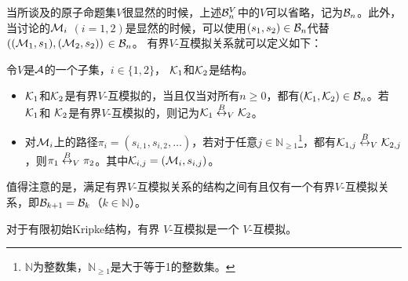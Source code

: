 当所谈及的原子命题集$V$很显然的时候，上述${\cal B}_n^V$中的$V$可以省略，记为${\cal B}_n$。此外，当讨论的${\cal M}_i$ $(i=1,2)$是显然的时候，可以使用$(s_1,s_2) \in {\cal B}_n$代替$(({\cal M}_1,s_1),({\cal M}_2,s_2))$ $\in {\cal B}_n$。
有界$V$-互模拟关系就可以定义如下：
\begin{definition}[有界$V$-互模拟]\label{def:V-bisimulation}
	令$V$是${\cal A}$的一个子集，$i\in \{1,2\}$， ${\cal K}_1$和${\cal K}_2$是结构。
	\begin{itemize}
		\item ${\cal K}_1$和${\cal K}_2$是有界$V$-互模拟的，当且仅当对所有$n \ge 0$，都有$({\cal K}_1, {\cal K}_2)\in {\cal B}_n$。若 ${\cal K}_1$和 ${\cal K}_2$是有界$V$-互模拟的，则记为${\cal K}_1 \overset{B}{\leftrightarrow}_V {\cal K}_2$。
		\item 对${\cal M}_i$上的路径$\pi_i=(s_{i,1},s_{i,2},\dots)$，若对于任意$j\in \mathbb{N}_{\ge 1}$\footnote{$\mathbb{N}$为整数集，$\mathbb{N}_{\ge 1}$是大于等于1的整数集。}，都有${\cal K}_{1,j} \overset{B}{\leftrightarrow}_V {\cal K}_{2,j}$，则$\pi_1 \overset{B}{\leftrightarrow}_V \pi_2$。其中${\cal K}_{i, j}=({\cal M}_i, s_{i,j})$。
	\end{itemize}
\end{definition}

值得注意的是，满足有界$V$-互模拟关系的结构之间有且仅有一个有界$V$-互模拟关系，即${\cal B}_{k+1} = {\cal B}_k$（$k \in \mathbb{N}$）。


\begin{lemma} \label{lem:HbBis}
	对于有限初始Kripke结构，有界 $V$-互模拟是一个 $V$-互模拟。
\end{lemma}

